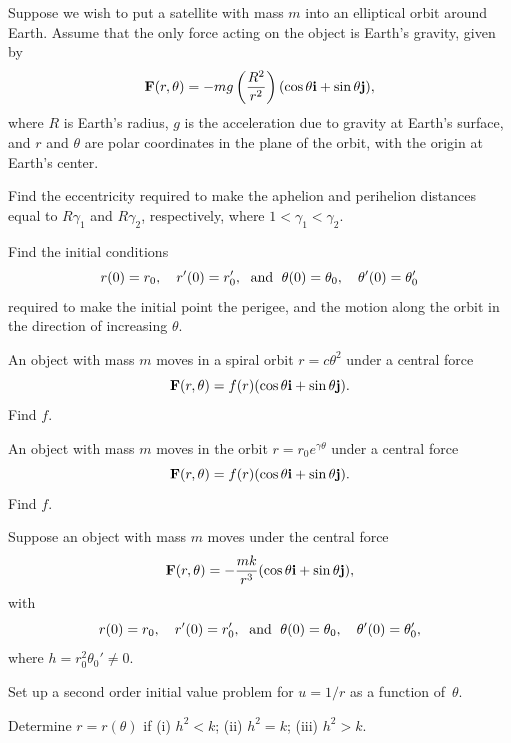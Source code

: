 \begin{exerciselist}
\item\label{exer:6.4.3}Suppose we wish to put a satellite with mass $m$ into an
elliptical orbit around Earth. Assume that the only force acting on
the object is Earth's gravity, given by
\[
\mathbf{F}(r,\theta)=-mg\left(\frac{R^2}{r^2}\right)(\cos\theta\mathbf{i}+\sin\theta\mathbf{j}),
\]
where $R$ is Earth's radius, $g$ is the acceleration due to gravity at
Earth's surface, and $r$ and $\theta$ are polar coordinates in the
plane of the orbit, with the origin at Earth's center.

\begin{alist}
\item %
Find the eccentricity required to make the aphelion and perihelion
distances equal to $R\gamma_1$ and $R\gamma_2$, respectively, where
$1<\gamma_1<\gamma_2$.
\item %
Find the  initial conditions
\[
r(0)=r_0,\quad  r'(0)=r_0', \text{\; and \;} \theta(0)=\theta_0,\quad
\theta'(0)=\theta_0'
\]
required to make the initial point the perigee, and the motion along
the orbit in the direction of increasing $\theta$. 
\end{alist}


\item\label{exer:6.4.4}An object with mass $m$  moves in a spiral orbit
$r=c\theta^2$ under a central force
\[
\mathbf{F}(r,\theta)=f(r)(\cos\theta\mathbf{i}+\sin\theta\mathbf{j}).
\]
Find $f$.


\item\label{exer:6.4.5}An object with mass $m$  moves in the orbit
$r=r_0e^{\gamma\theta}$ under a central force
\[
\mathbf{F}(r,\theta)=f(r)(\cos\theta\mathbf{i}+\sin\theta\mathbf{j}).
\]
 Find $f$.


\item\label{exer:6.4.6}Suppose an object with mass $m$ moves under the central force
\[
\mathbf{F}(r,\theta)=-\frac{mk}{r^3}(\cos\theta\mathbf{i}+\sin\theta\mathbf{j}),
\]
with
\[
r(0)=r_0,\quad  r'(0)=r_0', \text{\; and \;} \theta(0)=\theta_0,\quad
\theta'(0)=\theta_0',
\]
 where $h=r_0^2\theta_0'\ne0$.
\begin{alist}
\item %
 Set up a second order initial
value problem for $u=1/r$ as a function of~$\theta$.
\item %
Determine $r=r(\theta)$ if (i) $h^2<k$;\;   (ii) $h^2=k$;\;   (iii)
$h^2>k$.
\end{alist}

\end{exerciselist}
